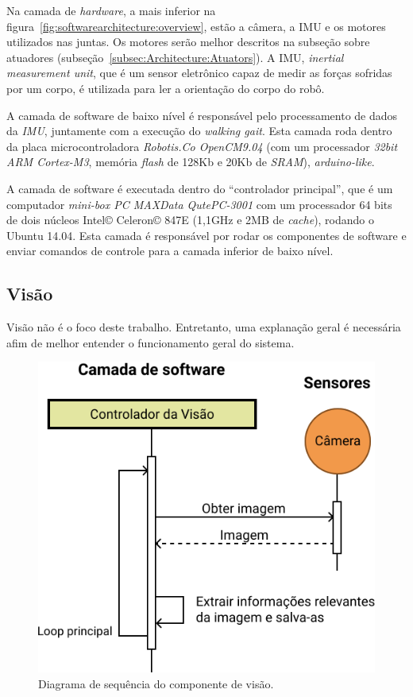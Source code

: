 Na camada de \textit{hardware}, a mais inferior na figura~\ref{fig:softwarearchitecture:overview}, estão a câmera, a IMU e os motores utilizados nas juntas. Os motores serão melhor descritos na subseção sobre atuadores (subseção~\ref{subsec:Architecture:Atuators}). A IMU, \textit{inertial measurement unit}, que é um sensor eletrônico capaz de medir as forças sofridas por um corpo, é utilizada para ler a orientação do corpo do robô.

A camada de software de baixo nível é responsável pelo processamento de dados da \textit{IMU}, juntamente com a execução do \textit{walking gait}. Esta camada roda dentro da placa microcontroladora \textit{Robotis.Co OpenCM9.04} (com um processador \textit{32bit ARM Cortex-M3}, memória \textit{flash} de 128Kb e 20Kb de \textit{SRAM}), \textit{arduino-like}.

A camada de software é executada dentro do ``controlador principal'', que é um computador \textit{mini-box PC MAXData QutePC-3001} com um processador 64 bits de dois núcleos Intel\copyright{} Celeron\copyright{} 847E (1,1GHz e 2MB de \textit{cache}), rodando o Ubuntu 14.04. Esta camada é responsável por rodar os componentes de software e enviar comandos de controle para a camada inferior de baixo nível.

\subsection{Visão}

Visão não é o foco deste trabalho. Entretanto, uma explanação geral é necessária afim de melhor entender o funcionamento geral do sistema.

\begin{figure}[h!]
	\centering
	\includegraphics[scale=1]{imagens/svg/softwarearchitecture-vision}
	\caption{Diagrama de sequência do componente de visão.}
	\label{fig:softwarearchitecture:vision}
\end{figure}

